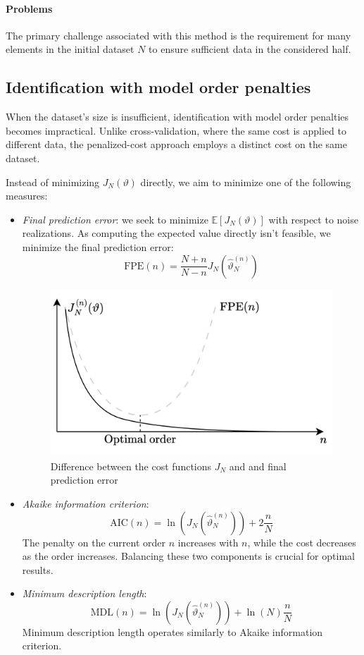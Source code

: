 \paragraph*{Problems}
The primary challenge associated with this method is the requirement for many elements in the initial dataset $N$ to ensure sufficient data in the considered half.

\subsection{Identification with model order penalties}
When the dataset's size is insufficient, identification with model order penalties becomes impractical. 
Unlike cross-validation, where the same cost is applied to different data, the penalized-cost approach employs a distinct cost on the same dataset.

Instead of minimizing $J_N(\vartheta)$ directly, we aim to minimize one of the following measures:
\begin{itemize}
    \item \textit{Final prediction error}: we seek to minimize $\mathbb{E}[J_N(\vartheta)]$ with respect to noise realizations. 
        As computing the expected value directly isn't feasible, we minimize the final prediction error:
        \[\text{FPE}(n)=\dfrac{N+n}{N-n}J_N\left(\hat{\vartheta}_N^{(n)}\right)\]
        \begin{figure}[H]
            \centering
            \includegraphics[width=0.54\linewidth]{images/fpe.png}
            \caption{Difference between the cost functions $J_N$ and and final prediction error}
        \end{figure}
    \item \textit{Akaike information criterion}:
        \[\text{AIC}(n)=\ln \left( J_N(\hat{\vartheta}_N^{(n)}) \right)+2\dfrac{n}{N}\]
        The penalty on the current order $n$ increases with $n$, while the cost decreases as the order increases. 
        Balancing these two components is crucial for optimal results.
    \item \textit{Minimum description length}: 
        \[\text{MDL}(n)=\ln \left( J_N(\hat{\vartheta}_N^{(n)})\right)+\ln(N)\dfrac{n}{N}\]
        Minimum description length operates similarly to Akaike information criterion.
\end{itemize}

